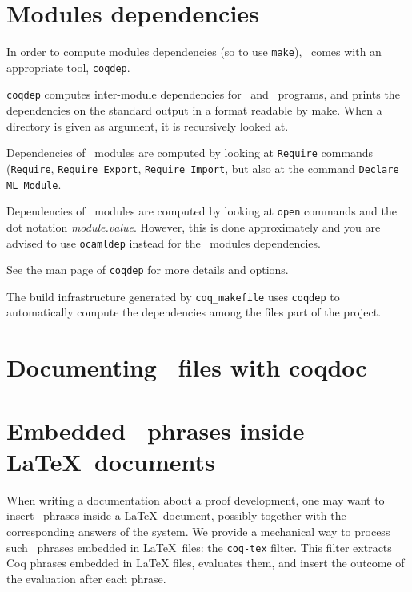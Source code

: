 \section[Modules dependencies]{Modules dependencies\label{Dependencies}
  }

In order to compute modules dependencies (so to use {\tt make}),
\Coq\ comes with an appropriate tool, {\tt coqdep}.

{\tt coqdep} computes inter-module dependencies for \Coq\ and
\ocaml\ programs, and prints the dependencies on the standard
output in a format readable by make.  When a directory is given as
argument, it is recursively looked at.

Dependencies of \Coq\ modules are computed by looking at {\tt Require}
commands ({\tt Require}, {\tt Requi\-re Export}, {\tt Require Import},
but also at the command {\tt Declare ML Module}.

Dependencies of \ocaml\ modules are computed by looking at
\verb!open! commands and the dot notation {\em module.value}. However,
this is done approximately and you are advised to use {\tt ocamldep}
instead for the \ocaml\ modules dependencies.

See the man page of {\tt coqdep} for more details and options.

The build infrastructure generated by {\tt coq\_makefile}
uses {\tt coqdep} to automatically compute the dependencies
among the files part of the project.

\section[Documenting \Coq\ files with coqdoc]{Documenting \Coq\ files with coqdoc\label{coqdoc}
}



\section[Embedded \Coq\ phrases inside \LaTeX\ documents]{Embedded \Coq\ phrases inside \LaTeX\ documents\label{Latex}
  }

When writing a documentation about a proof development, one may want
to insert \Coq\ phrases inside a \LaTeX\ document, possibly together with
the corresponding answers of the system. We provide a
mechanical way to process such \Coq\ phrases embedded in \LaTeX\ files: the
{\tt coq-tex} filter.  This filter extracts Coq phrases embedded in
LaTeX files, evaluates them, and insert the outcome of the evaluation
after each phrase.

